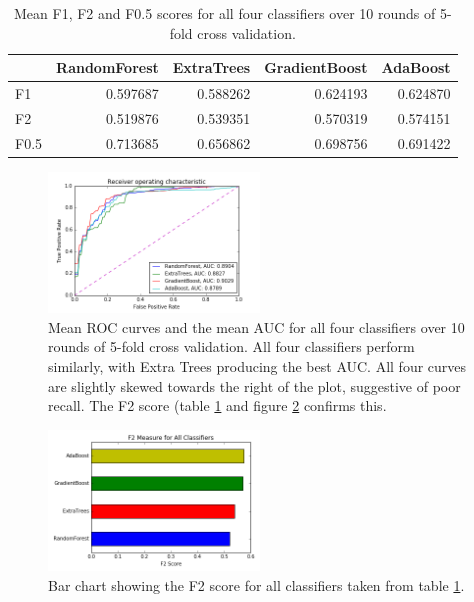 \documentclass[journal]{IEEEtran}
\begin{document}
\begin{table}
\caption{Mean F1, F2 and F0.5 scores for all four classifiers over 10 rounds of 5-fold cross validation.}
\label{table:f-scores}
\begin{tabular}{lrrrr}
{} &  RandomForest &  ExtraTrees &  GradientBoost &  AdaBoost \\
\hline
F1   &      0.597687 &    0.588262 &       0.624193 &  0.624870 \\
F2   &      0.519876 &    0.539351 &       0.570319 &  0.574151 \\
F0.5 &      0.713685 &    0.656862 &       0.698756 &  0.691422 \\
\end{tabular}

\end{table}

\begin{figure}[!t]
\centering
\includegraphics[width=0.5\textwidth]{../src/img/roc_cv.png}
\caption{Mean ROC curves and the mean AUC for all four classifiers over 10 rounds of 5-fold cross validation. All four classifiers perform similarly, with Extra Trees producing the best AUC. All four curves are slightly skewed towards the right of the plot, suggestive of poor recall. The F2 score (table \ref{table:f-scores} and figure \ref{fig:f2-score} confirms this.}
\label{fig:roc-cv}
\end{figure}

\begin{figure}[!t]
\centering
\includegraphics[width=0.5\textwidth]{../src/img/f2_score.png}
\caption{Bar chart showing the F2 score for all classifiers taken from table \ref{table:f-scores}.}
\label{fig:f2-score}
\end{figure}
\end{document}
